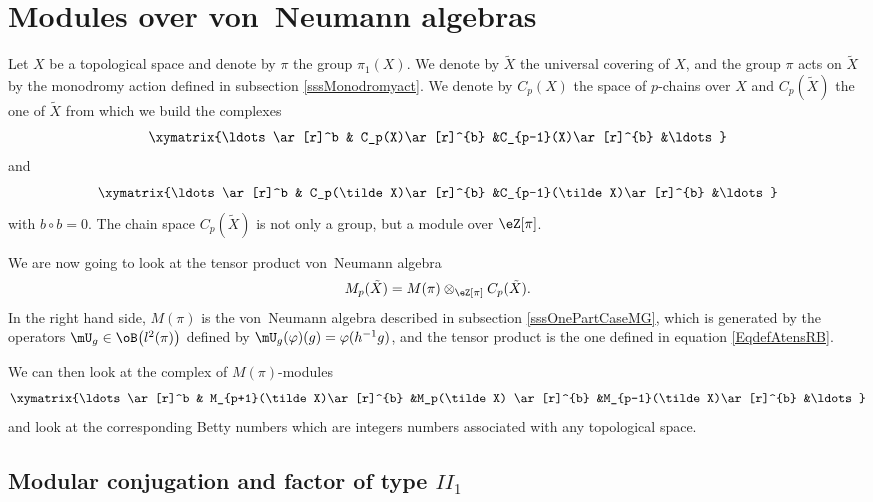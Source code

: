 					\section{Modules over von~Neumann algebras}
\label{SecOverModVNalgDim}

Let $X$ be a topological space and denote by $\pi$ the group $\pi_1(X)$. We denote by $\tilde X$ the universal covering of $X$, and the group $\pi$ acts on $\tilde X$ by the monodromy action defined in subsection \ref{sssMonodromyact}. We denote by $C_p(X)$ the space of $p$-chains over $X$ and $C_p(\tilde X)$ the one of $\tilde X$ from which we build the complexes
\[ 
  \xymatrix{%
   \ldots \ar[r]^b	&	C_p(X)\ar[r]^{b}	&C_{p-1}(X)\ar[r]^{b}	&\ldots	
}
\]
and
\[ 
  \xymatrix{%
   \ldots \ar[r]^b	&	C_p(\tilde X)\ar[r]^{b}	&C_{p-1}(\tilde X)\ar[r]^{b}	&\ldots	
}
\]
with $b\circ b=0$. The chain space $C_p(\tilde X)$ is not only a group, but a module over $\eZ[\pi]$.

We are now going to look at the tensor product von~Neumann algebra
\begin{equation}
	M_p(\tilde X)=M(\pi)\otimes_{\eZ[\pi]}C_p(\tilde X).
\end{equation}
In the right hand side, $M(\pi)$ is the von~Neumann algebra described in subsection \ref{sssOnePartCaseMG}, which is generated by the operators $\mU_g\in\oB\big( l^2(\pi) \big)$ defined by $\mU_g(\varphi)(g)=\varphi(h^{-1}g)$, and the tensor product is the one defined in equation \eqref{EqdefAtensRB}.

We can then look at the complex of $M(\pi)$-modules
\[ 
  \xymatrix{%
   \ldots \ar[r]^b	&	M_{p+1}(\tilde X)\ar[r]^{b}	&M_p(\tilde X) \ar[r]^{b}	&M_{p-1}(\tilde X)\ar[r]^{b}	&\ldots	
}
\]
and look at the corresponding Betty numbers which are integers numbers associated with any topological space.


					\subsection{Modular conjugation and factor of type \texorpdfstring{$II_1$}{II1}}

